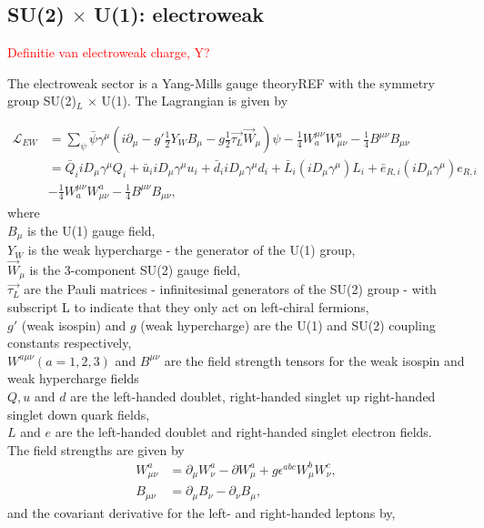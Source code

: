 \subsection{SU(2) $\times$ U(1): electroweak}
\label{subsec:ew}

\textcolor{red}{Definitie van electroweak charge, Y?}

The electroweak sector is a Yang-Mills gauge theoryREF with the symmetry group SU(2)$_L$ $\times$ U(1). The Lagrangian is given by

\begin{equation}
\label{eq:EW}
\begin{split}
\mathcal{L}_{EW} &= \sum_{\psi} \bar{\psi} \gamma^\mu \left(i\partial_\mu - g' \frac{1}{2}Y_W B_\mu - g \frac{1}{2} \overrightarrow{\tau_L} \overrightarrow{W}_\mu \right) \psi - \frac{1}{4} W^{\mu\nu}_a W^{a}_{\mu\nu} -\frac{1}{4} B^{\mu\nu} B_{\mu\nu} \\ 
&= \bar{Q}_i i D_\mu \gamma^\mu Q_i + \bar{u}_i i D_\mu \gamma^\mu u_i + \bar{d}_i i D_\mu \gamma^\mu d_i + \bar{L}_i\left(iD_\mu\gamma^\mu\right)L_i + \bar{e}_{R,i}\left(iD_\mu\gamma^\mu\right)e_{R,i} \\ &
- \frac{1}{4} W^{\mu\nu}_a W^{a}_{\mu\nu} -\frac{1}{4} B^{\mu\nu} B_{\mu\nu},
\end{split}
\end{equation}
where\\
\indent $B_\mu$ is the U(1) gauge field,\\
\indent $Y_W$ is the weak hypercharge - the generator of the U(1) group,\\
\indent $\overrightarrow{W}_\mu$ is the 3-component SU(2) gauge field,\\
\indent $\overrightarrow{\tau_L}$ are the Pauli matrices - infinitesimal generators of the SU(2) group - with subscript L to indicate that they only act on left-chiral fermions,\\
\indent $g'$ (weak isospin) and $g$ (weak hypercharge) are the U(1) and SU(2) coupling constants respectively,\\
\indent $W^{a\mu\nu} (a=1,2,3)$ and $B^{\mu\nu}$ are the field strength tensors for the weak isospin and weak hypercharge fields\\
\indent $Q, u$ and $d$ are the left-handed doublet, right-handed singlet up right-handed singlet down quark fields,\\
\indent $L$ and $e$ are the left-handed doublet and right-handed singlet electron fields.
\\
The field strengths are given by
\begin{equation*}
\begin{split}
W^a_{\mu\nu} &= \partial_\mu W^a_\nu - \partial W^a_\mu + g \epsilon^{abc}W^b_\mu W^c_\nu,\\
B_{\mu\nu} &= \partial_\mu B_\nu - \partial_\nu B_\mu,
\end{split}
\end{equation*}
\noindent and the covariant derivative for the left- and right-handed leptons by,

